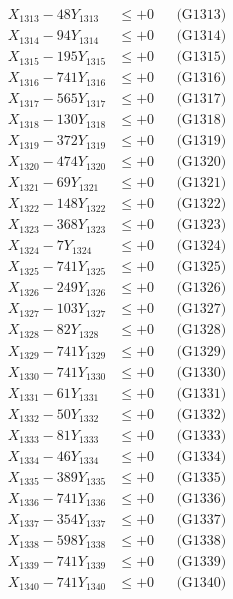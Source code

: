 \documentclass[a4paper,10pt]{article}
\begin{document}
{\begin{align}
X_{1313} - 48Y_{1313} &\leq +0 && \text{(G1313)} \\
X_{1314} - 94Y_{1314} &\leq +0 && \text{(G1314)} \\
X_{1315} - 195Y_{1315} &\leq +0 && \text{(G1315)} \\
X_{1316} - 741Y_{1316} &\leq +0 && \text{(G1316)} \\
X_{1317} - 565Y_{1317} &\leq +0 && \text{(G1317)} \\
X_{1318} - 130Y_{1318} &\leq +0 && \text{(G1318)} \\
X_{1319} - 372Y_{1319} &\leq +0 && \text{(G1319)} \\
X_{1320} - 474Y_{1320} &\leq +0 && \text{(G1320)} \\
\allowbreak
X_{1321} - 69Y_{1321} &\leq +0 && \text{(G1321)} \\
X_{1322} - 148Y_{1322} &\leq +0 && \text{(G1322)} \\
X_{1323} - 368Y_{1323} &\leq +0 && \text{(G1323)} \\
X_{1324} - 7Y_{1324} &\leq +0 && \text{(G1324)} \\
X_{1325} - 741Y_{1325} &\leq +0 && \text{(G1325)} \\
X_{1326} - 249Y_{1326} &\leq +0 && \text{(G1326)} \\
X_{1327} - 103Y_{1327} &\leq +0 && \text{(G1327)} \\
X_{1328} - 82Y_{1328} &\leq +0 && \text{(G1328)} \\
X_{1329} - 741Y_{1329} &\leq +0 && \text{(G1329)} \\
X_{1330} - 741Y_{1330} &\leq +0 && \text{(G1330)} \\
\allowbreak
X_{1331} - 61Y_{1331} &\leq +0 && \text{(G1331)} \\
X_{1332} - 50Y_{1332} &\leq +0 && \text{(G1332)} \\
X_{1333} - 81Y_{1333} &\leq +0 && \text{(G1333)} \\
X_{1334} - 46Y_{1334} &\leq +0 && \text{(G1334)} \\
X_{1335} - 389Y_{1335} &\leq +0 && \text{(G1335)} \\
X_{1336} - 741Y_{1336} &\leq +0 && \text{(G1336)} \\
X_{1337} - 354Y_{1337} &\leq +0 && \text{(G1337)} \\
X_{1338} - 598Y_{1338} &\leq +0 && \text{(G1338)} \\
X_{1339} - 741Y_{1339} &\leq +0 && \text{(G1339)} \\
X_{1340} - 741Y_{1340} &\leq +0 && \text{(G1340)} \\

\end{align}}
\end{document}
